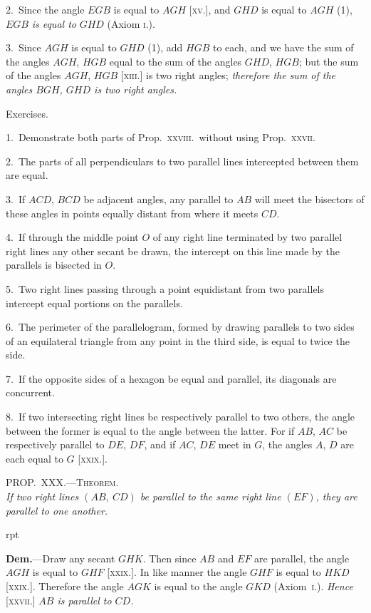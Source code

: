\documentclass[oneside]{book}
\newcounter{wrapwidth}
\newcommand\myprop[2]{
\bigskip\Needspace*{4\baselineskip}\begin{center}\textsc{#1}\\\medskip\emph{#2}\par\end{center}
}
\newcommand\exhead[1]{
\Needspace*{5\baselineskip}\begin{center}
\textsf{#1}
\end{center}
}
\newcommand\imgflow[3]{
\setcounter{wrapwidth}{#1}

\begin{wrapfigure}[#2]{r}{\value{wrapwidth}pt}
\begin{center}
\vspace{-0.3in}

\end{center}
\end{wrapfigure}
}
\begin{document}
2.~Since the angle $EGB$ is equal to $AGH$ [\textsc{xv.}], and
$GHD$ is equal to $AGH$ (1), $EGB$ \emph{is equal to} $GHD$
(Axiom \textsc{i}.).

3.~Since $AGH$ is equal to $GHD$ (1), add $HGB$ to each,
and we have the sum of the angles $AGH$, $HGB$ equal
to the sum of the angles $GHD$, $HGB$; but the sum of the
angles $AGH$, $HGB$ [\textsc{xiii.}] is two right angles; \textit{therefore
the sum of the angles $BGH$, $GHD$ is two right angles.}

\exhead{Exercises.}

\begin{footnotesize}
1.~Demonstrate both parts of Prop.\ \textsc{xxviii.}\ without using Prop.\
\textsc{xxvii}.

2.~The parts of all perpendiculars to two parallel lines intercepted
between them are equal.

3.~If $ACD$, $BCD$ be adjacent angles, any parallel to $AB$ will
meet the bisectors of these angles in points equally distant from
where it meets $CD$.



4.~If through the middle point $O$ of any right line terminated
by two parallel right lines any other secant be drawn, the intercept
on this line made by the parallels is bisected in $O$.

5.~Two right lines passing through a point equidistant from
two parallels intercept equal portions on the parallels.

6.~The perimeter of the parallelogram, formed by drawing
parallels to two sides of an equilateral triangle from any point in
the third side, is equal to twice the side.

7.~If the opposite sides of a hexagon be equal and parallel, its
diagonals are concurrent.

8.~If two intersecting right lines be respectively parallel to two
others, the angle between the former is equal to the angle between
the latter. For if $AB$, $AC$ be respectively parallel to $DE$,
$DF$, and if $AC$, $DE$ meet in $G$, the angles $A$, $D$ are each equal to
$G$ [\textsc{xxix}.].
\par\end{footnotesize}


\myprop{PROP\@.~XXX\@.---Theorem.}{If two right lines $(AB,\ CD)$ be parallel to the same right
line $(EF)$, they are parallel to one another.}


\imgflow{125}{7}{f050}

\textbf{Dem.}---Draw any secant
$GHK$. Then since $AB$ and
$EF$ are parallel, the angle $AGH$
is equal to $GHF$ [\textsc{xxix}.]. In like
manner the angle $GHF$ is equal
to $HKD$ [\textsc{xxix}.]. Therefore the
angle $AGK$ is equal to the
angle $GKD$ (Axiom~\textsc{i}.). \textit{Hence }
[\textsc{xxvii}.] \textit{$AB$ is parallel to $CD$.}
\end{document}
